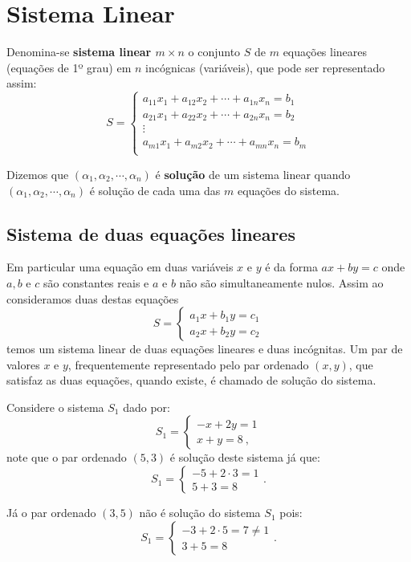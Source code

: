 \chapter{Sistema Linear}

Denomina-se \textbf{sistema linear $m \times n$} o conjunto $S$ de $m$ equações lineares (equações de 1º grau) em $n$ incógnicas (variáveis), que pode ser representado assim:
\[S= \begin{cases}
      a_{11}x_1 + a_{12}x_2 + \cdots + a_{1n}x_n = b_1 \\
      a_{21}x_1 + a_{22}x_2 + \cdots + a_{2n}x_n = b_2 \\
      \vdots \\
      a_{m1}x_1 + a_{m2}x_2 + \cdots + a_{mn}x_n = b_m \\
     \end{cases} \]

Dizemos que $(\alpha_1, \alpha_2, \cdots, \alpha_n)$ é \textbf{solução} de um sistema linear quando $(\alpha_1, \alpha_2, \cdots, \alpha_n)$ é solução de cada uma das $m$ equações do sistema.

\section{Sistema de duas equações lineares}

\vskip0.3cm
 \colorbox{azul}{
 \begin{minipage}{0.9\linewidth}

  Em particular uma equação em duas variáveis $x$ e $y$ é da forma $ax + by= c$ onde $a, b$ e $c$ são constantes reais e $a$ e $b$ não são simultaneamente nulos. Assim ao consideramos duas destas equações
  \[S= \begin{cases}
      a_1x + b_1y= c_1 \\
      a_2x + b_2y= c_2
     \end{cases}\]
 temos um sistema linear de duas equações lineares e duas incógnitas. Um par de valores $x$ e $y$, frequentemente representado pelo par ordenado $(x, y)$, que satisfaz as duas equações, quando existe, é chamado de solução do sistema.

 \end{minipage}}
 \vskip0.3cm

\begin{exem}
 Considere o sistema $S_1$ dado por:
 \[S_1= \begin{cases}
      -x + 2y= 1 \\
      x + y= 8 \ ,
     \end{cases}\]
 note que o par ordenado $(5, 3)$ é solução deste sistema já que:
 \[S_1= \begin{cases}
      -5 + 2 \cdot 3= 1 \\
      5 + 3= 8
     \end{cases} .\]

Já o par ordenado $(3, 5)$ não é solução do sistema $S_1$ pois:
\[S_1= \begin{cases}
      -3 + 2 \cdot 5= 7 \neq 1 \\
      3 + 5= 8
     \end{cases} .\]
\end{exem}

